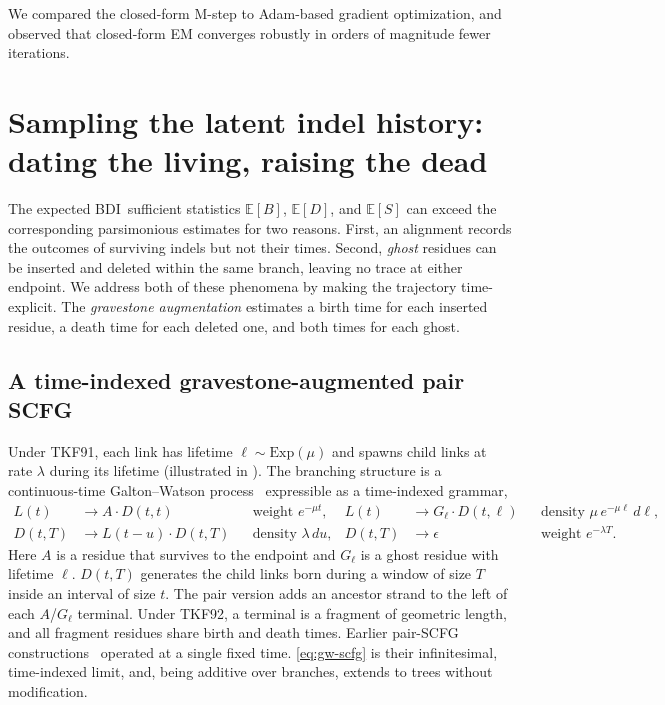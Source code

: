\documentclass{article}
\newcommand{\BDI}{\textsc{BDI}}
\newcommand{\E}{\mathbb{E}}
\newcommand{\ins}{\lambda}
\newcommand{\del}{\mu}
\begin{document}
We compared the closed-form M-step to Adam-based gradient optimization, and observed
that closed-form EM converges robustly in orders of magnitude fewer iterations.

\section{Sampling the latent indel history: dating the living, raising the dead}
\label{sec:gravestone}

The expected \BDI\ sufficient statistics $\E[B]$, $\E[D]$, and $\E[S]$
can exceed the corresponding parsimonious estimates for two reasons.
First, an alignment records the outcomes of surviving indels but not their times. 
Second, \emph{ghost} residues can be inserted and deleted within the same branch, 
leaving no trace at either endpoint. We address both of these phenomena by making the trajectory time-explicit. The \emph{gravestone augmentation} estimates a 
birth time for each inserted residue, a death time for each deleted one, 
and both times for each ghost.


\subsection{A time-indexed gravestone-augmented pair SCFG}
Under TKF91, each link has lifetime $\ell\sim\mathrm{Exp}(\del)$ and spawns child
links at rate $\ins$ during its lifetime (illustrated in ). The branching structure is a
continuous-time Galton--Watson process~\cite{Metzler2003} expressible as
a time-indexed grammar,
\begin{equation}
\label{eq:gw-scfg}
\begin{aligned}
L(t) &\to A \cdot D(t,t)
        && \text{weight } e^{-\del t}, &
L(t) &\to G_\ell \cdot D(t,\ell)
        && \text{density } \del\, e^{-\del\ell}\,d\ell,\\
D(t,T) &\to L(t-u) \cdot D(t,T)
        && \text{density } \ins\, du, &
D(t,T) &\to \epsilon
        && \text{weight } e^{-\ins T}.
\end{aligned}
\end{equation}
Here $A$ is a residue that survives to the endpoint and $G_\ell$ is a
ghost residue with lifetime $\ell$. $D(t,T)$ generates the
child links born during a window of size $T$ inside an interval of size
$t$. The pair version adds an ancestor strand to the left of each $A$/$G_\ell$ terminal.
Under TKF92, a terminal is a fragment of geometric length, and all fragment
residues share birth and death times.
Earlier pair-SCFG 
constructions~\cite{Sankoff85,KnudsenHein1999,Rivas2008,HolmesRubin2002,HolmesRubin2002psb}
operated at a single fixed time. \eqref{eq:gw-scfg} is their
infinitesimal, time-indexed limit, and, being additive over branches,
extends to trees without modification.
\end{document}
